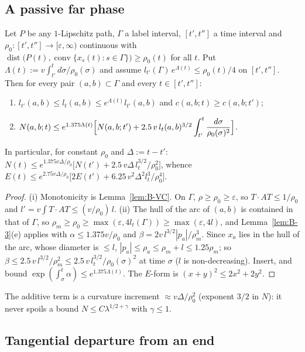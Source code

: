 \subsection{A passive far phase}

\begin{lemma}\label{lem:E-far}
Let $P$ be any $1$-Lipschitz path, $\Gamma$ a label interval, $[t',t'']$ a time interval and
$\rho_0:[t',t'']\to[\varepsilon,\infty)$ continuous with
$\operatorname{dist}\bigl(P(t),\operatorname{conv}\{x_s(t):s\in\Gamma\}\bigr)\ge\rho_0(t)$ for all $t$. Put
$\Lambda(t):=v\int_{t'}^t d\sigma/\rho_0(\sigma)$ and assume $l_{t'}(\Gamma)\,e^{\Lambda(t)}\le\rho_0(t)/4$ on $[t',t'']$. Then for
every pair $(a,b)\subset\Gamma$ and every $t\in[t',t'']$:
\begin{enumerate}
\item[(i)] $l_{t'}(a,b)\le l_t(a,b)\le e^{\Lambda(t)}l_{t'}(a,b)$ and $c(a,b;t)\ge c(a,b;t')$;
\item[(ii)] $N(a,b;t)\le e^{1.375\Lambda(t)}\Bigl[N(a,b;t')+2.5\,v\,l_t(a,b)^{3/2}\displaystyle\int_{t'}^t\frac{d\sigma}{\rho_0(\sigma)^2}\Bigr]$.
\end{enumerate}
In particular, for constant $\rho_0$ and $\Delta:=t-t'$:
$N(t)\le e^{1.375v\Delta/\rho_0}\bigl[N(t')+2.5\,v\Delta\,l_t^{3/2}/\rho_0^2\bigr]$, whence
$E(t)\le e^{2.75v\Delta/\rho_0}\bigl[2E(t')+6.25\,v^2\Delta^2l_t^3/\rho_0^4\bigr]$.
\end{lemma}
\begin{proof}
(i) Monotonicity is Lemma~\ref{lem:B-VC}. On $\Gamma$, $\rho\ge\rho_0\ge\varepsilon$, so $T\cdot AT\le1/\rho_0$ and
$l'=v\int T\cdot AT\le(v/\rho_0)\,l$. (ii) The hull of the arc of $(a,b)$ is contained in that of $\Gamma$, so
$\rho_m\ge\rho_0\ge\max(\varepsilon,4l_t(\Gamma))\ge\max(\varepsilon,4l)$, and Lemma~\ref{lem:B-3}(e) applies with
$\alpha\le1.375v/\rho_0$ and $\beta=2v\,l^{3/2}|p_a|/\rho_m^3$. Since $x_a$ lies in the hull of the arc, whose diameter is $\le l$,
$|p_a|\le\rho_a\le\rho_m+l\le1.25\rho_m$; so $\beta\le2.5\,v\,l^{3/2}/\rho_m^2\le2.5\,v\,l_t^{3/2}/\rho_0(\sigma)^2$ at time $\sigma$
($l$ is non-decreasing). Insert, and bound $\exp(\int_\sigma^t\alpha)\le e^{1.375\Lambda(t)}$. The $E$-form is
$(x+y)^2\le2x^2+2y^2$.
\end{proof}
The additive term is a curvature increment $\approx v\Delta/\rho_0^2$ (exponent $3/2$ in $N$): it never spoils a bound
$N\le C\lambda^{1/2+\gamma}$ with $\gamma\le1$.

\subsection{Tangential departure from an end}

